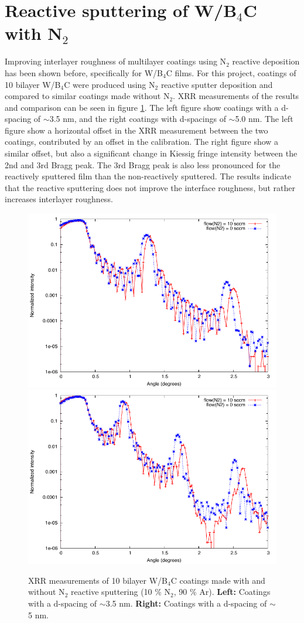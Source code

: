 \section{Reactive sputtering of W/B$_4$C with N$_2$}
Improving interlayer roughness of multilayer coatings using N$_2$ reactive deposition has been shown before\cite{Windt:2007uj,jakobsen2010developing}, specifically for W/B$_4$C films. For this project, coatings of 10 bilayer W/B$_4$C were produced using N$_2$ reactive sputter deposition and compared to similar coatings made without N$_2$. XRR measurements of the results and comparison can be seen in figure \ref{fig:wb4c-n2}. The left figure show coatings with a d-spacing of $\sim$3.5 nm, and the right coatings with d-spacings of $\sim$5.0 nm. The left figure show a horizontal offset in the XRR measurement between the two coatings, contributed by an offset in the calibration. The right figure show a similar offset, but also a significant change in Kiessig fringe intensity between the 2nd and 3rd Bragg peak. The 3rd Bragg peak is also less pronounced for the reactively sputtered film than the non-reactively sputtered. The results indicate that the reactive sputtering does not improve the interface roughness, but rather increases interlayer roughness.

\begin{figure}[!h]
	\center
	\includegraphics[width=0.47\linewidth]{figures/athena/coatings/w-b4c_n2_35AA.pdf}
	\includegraphics[width=0.47\linewidth]{figures/athena/coatings/w-b4c_n2_50AA.pdf}
\caption{\footnotesize XRR measurements of 10 bilayer W/B$_4$C coatings made with and without N$_2$ reactive sputtering (10 \% N$_2$, 90 \% Ar). \textbf{Left:} Coatings with a d-spacing of $\sim$3.5 nm. \textbf{Right:} Coatings with a d-spacing of $\sim$5 nm.}\label{fig:wb4c-n2}
\end{figure}

